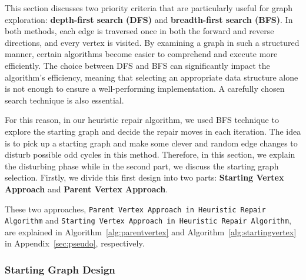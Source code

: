 This section discusses two priority criteria that are particularly useful for graph exploration: \textbf{depth-first search (DFS)} and \textbf{breadth-first search (BFS)}. In both methods, each edge is traversed once in both the forward and reverse directions, and every vertex is visited. By examining a graph in such a structured manner, certain algorithms become easier to comprehend and execute more efficiently. The choice between DFS and BFS can significantly impact the algorithm's efficiency, meaning that selecting an appropriate data structure alone is not enough to ensure a well-performing implementation. A carefully chosen search technique is also essential. 

For this reason, in our heuristic repair algorithm, we used BFS technique to explore the starting graph and decide the repair moves in each iteration. The idea is to pick up a starting graph and make some clever and random edge changes to disturb possible odd cycles in this method. Therefore, in this section, we explain the disturbing phase while in the second part, we discuss the starting graph selection. Firstly, we divide this first design into two parts: \textbf{Starting Vertex Approach} and \textbf{Parent Vertex Approach}.

These two approaches, \texttt{Parent Vertex Approach in Heuristic Re\-pair Al\-go\-rithm} and \texttt{Starting Vertex Approach in Heuristic Repair Al\-go\-rithm}, are explained in Algorithm~\ref{alg:parentvertex} and Algorithm~\ref{alg:startingvertex} in Appendix~\ref{sec:pseudo}, respectively.





\subsubsection{Starting Graph Design}

